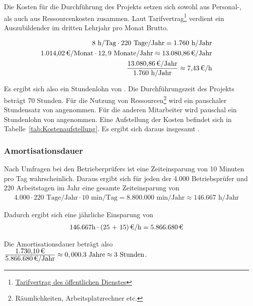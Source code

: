 Die Kosten für die Durchführung des Projekts setzen sich sowohl aus Personal-, als auch aus Ressourcenkosten zusammen.
Laut Tarifvertrag\footnote{\href{http://oeffentlicher-dienst.info/tvoed/bund/azubi.html}{Tarifvertrag des öffentlichen Dienstes}} verdient ein Auszubildender im dritten Lehrjahr pro Monat  Brutto. 

\begin{eqnarray}
8 \mbox{ h/Tag} \cdot 220 \mbox{ Tage/Jahr} = 1.760 \mbox{ h/Jahr}\\
\eur{1.014,02}\mbox{/Monat} \cdot 12,9 \mbox{ Monate/Jahr} \approx \eur{13.080,86} \mbox{/Jahr}\\
\frac{\eur{13.080,86} \mbox{/Jahr}}{1.760 \mbox{ h/Jahr}} \approx \eur{7,43}\mbox{/h}
\end{eqnarray}

Es ergibt sich also ein Stundenlohn von . 
Die Durchführungszeit des Projekts beträgt 70 Stunden. Für die Nutzung von Ressourcen\footnote{Räumlichkeiten, Arbeitsplatzrechner etc.} wird 
ein pauschaler Stundensatz von  angenommen. Für die anderen Mitarbeiter wird pauschal ein Stundenlohn von  angenommen. 
Eine Aufstellung der Kosten befindet sich in Tabelle~\ref{tab:Kostenaufstellung}. Es ergibt sich daraus insgesamt .


\subsubsection{Amortisationsdauer}
\label{sec:Amortisationsdauer}

Nach Umfragen bei den Betrieberprüfers ist eine Zeiteinsparung von 10 Minuten pro Tag wahrscheinlich. Daraus ergibt sich für jeden der 4.000 Betriebsprüfer und 220 Arbeitstagen im Jahr eine gesamte Zeiteinsparung von 
\begin{eqnarray}
4.000 \cdot 220 \mbox{ Tage/Jahr} \cdot 10 \mbox{ min/Tag} = 8.800.000 \mbox{ min/Jahr} \approx 146.667 \mbox{ h/Jahr} 
\end{eqnarray}

Dadurch ergibt sich eine jährliche Einsparung von 
\begin{eqnarray}
146.667 \mbox{h} \cdot \eur{(25 + 15)}{\mbox{/h}} = \eur{5.866.680}
\end{eqnarray}

Die Amortisationsdauer beträgt also $\frac{\eur{1.730,10}}{\eur{5.866.680}\mbox{/Jahr}} \approx 0,000.3 \mbox{ Jahre} \approx 3 \mbox{ Stunden}$.

